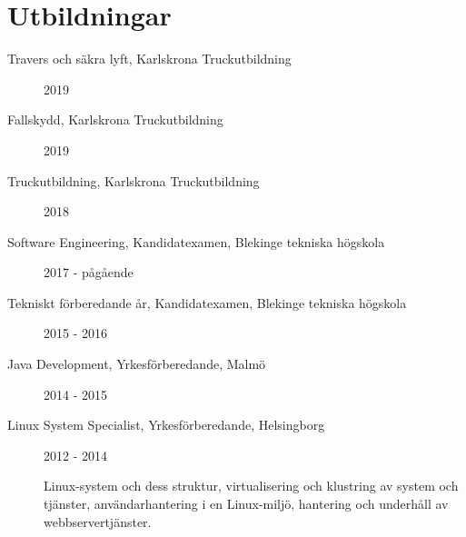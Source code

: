 \documentclass{article}
\begin{document}
	\begin{minipage}[t]{0.7\textwidth}	
	  
	  
	  
    \end{minipage}%
    \vspace{20pt} %
	\section*{\textcolor{colorBlue}{Utbildningar}}
	\begin{description}
		\item [ Travers och säkra lyft, Karlskrona Truckutbildning ] 2019
		\item [ Fallskydd, Karlskrona Truckutbildning ] 2019
		\item [ Truckutbildning, Karlskrona Truckutbildning ] 2018
		\item [ Software Engineering, Kandidatexamen, Blekinge tekniska högskola ] 2017 - pågående
		\item [ Tekniskt förberedande år, Kandidatexamen, Blekinge tekniska högskola ] 2015 - 2016
		\item [ Java Development, Yrkesförberedande, Malmö ] 2014 - 2015
		\item [ Linux System Specialist, Yrkesförberedande, Helsingborg ] 2012 - 2014 
		
		Linux-system och dess struktur, virtualisering och klustring av system och tjänster, användarhantering i en Linux-miljö, hantering och underhåll av webbservertjänster.
	\end{description}
\end{document}
